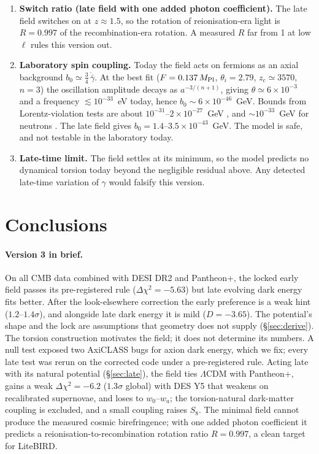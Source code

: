 \documentclass[11pt]{article}
\newcommand{\Mp}{M_{\rm Pl}}
\newcommand{\AthreeD}{\ensuremath{-3.65}}  %
\begin{document}
\begin{enumerate}
\item \textbf{Switch ratio (late field with one added photon coefficient).} The late field switches on at
$z\approx1.5$, so the rotation of reionisation-era light is $R=0.997$ of the recombination-era rotation. A
measured $R$ far from 1 at low $\ell$ rules this version out.
\item \textbf{Laboratory spin coupling.} Today the field acts on fermions as an axial
background $b_0\simeq\frac34\,\dot{\bar\gamma}$. At the best fit ($F=0.137\,\Mp$,
$\theta_i=2.79$, $z_c\simeq3570$, $n=3$) the oscillation amplitude decays as $a^{-3/(n+1)}$,
giving $\theta\simeq6\times10^{-3}$ and a frequency $\lesssim10^{-33}$~eV today, hence
$b_0\sim6\times10^{-46}$~GeV. Bounds from Lorentz-violation tests are about
$10^{-31}$--$2\times10^{-27}$~GeV \cite{kostelecky2008}, and $\sim10^{-33}$~GeV for neutrons
\cite{brown2010}. The late field gives $b_0=1.4$--$3.5\times10^{-43}$~GeV. The model is safe, and not
testable in the laboratory today.
\item \textbf{Late-time limit.} The field settles at its minimum, so the model predicts no
dynamical torsion today beyond the negligible residual above. Any detected late-time
variation of $\gamma$ would falsify this version.
\end{enumerate}

\section{Conclusions}
\paragraph{Version 3 in brief.} On all CMB data combined with DESI DR2 and Pantheon+, the locked early field passes
its pre-registered rule ($\Delta\chi^2=-5.63$) but late evolving dark energy fits better. After the look-elsewhere
correction the early preference is a weak hint ($1.2$--$1.4\sigma$), and alongside late dark energy it is mild
($D=\AthreeD$). The potential's shape and the lock are assumptions that geometry does not supply
(\S\ref{sec:derive}). The torsion construction motivates the field; it does not determine its numbers. A null test
exposed two AxiCLASS bugs for axion dark energy, which we fix; every late test was rerun on the corrected code under a
pre-registered rule. Acting late with its natural potential (\S\ref{sec:late}), the field ties $\Lambda$CDM with
Pantheon+, gains a weak $\Delta\chi^2=-6.2$ ($1.3\sigma$ global) with DES Y5 that weakens on recalibrated supernovae,
and loses to $w_0$--$w_a$; the torsion-natural dark-matter coupling is excluded, and a small coupling raises $S_8$. The
minimal field cannot produce the measured cosmic birefringence; with one added photon coefficient it predicts a
reionisation-to-recombination rotation ratio $R=0.997$, a clean target for LiteBIRD.
\end{document}
